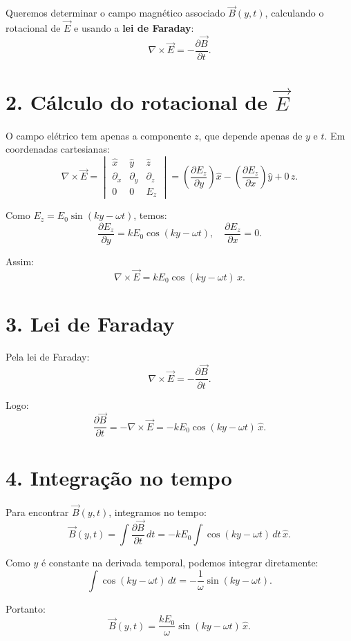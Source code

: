 \documentclass[a4paper,12pt]{article}
\begin{document}
\begin{flushleft}
Queremos determinar o campo magnético associado \(\vec{B}(y,t)\), calculando o rotacional de \(\vec{E}\) e usando a \textbf{lei de Faraday}:
\[
\nabla \times \vec{E} = -\frac{\partial \vec{B}}{\partial t}.
\]

\section*{2. Cálculo do rotacional de \(\vec{E}\)}

O campo elétrico tem apenas a componente \(z\), que depende apenas de \(y\) e \(t\).  
Em coordenadas cartesianas:
\[
\nabla \times \vec{E} =
\begin{vmatrix}
\hat{x} & \hat{y} & \hat{z} \\[4pt]
\partial_x & \partial_y & \partial_z \\[4pt]
0 & 0 & E_z
\end{vmatrix}
=
\left( \frac{\partial E_z}{\partial y} \right) \hat{x} - \left( \frac{\partial E_z}{\partial x} \right) \hat{y} + 0 \, \hat{z}.
\]

Como \(E_z = E_0 \sin(k y - \omega t)\), temos:
\[
\frac{\partial E_z}{\partial y} = k E_0 \cos(k y - \omega t),
\quad
\frac{\partial E_z}{\partial x} = 0.
\]

Assim:
\[
\nabla \times \vec{E} = k E_0 \cos(k y - \omega t) \, \hat{x}.
\]

\section*{3. Lei de Faraday}

Pela lei de Faraday:
\[
\nabla \times \vec{E} = -\frac{\partial \vec{B}}{\partial t}.
\]

Logo:
\[
\frac{\partial \vec{B}}{\partial t} = -\nabla \times \vec{E} = -k E_0 \cos(k y - \omega t) \, \hat{x}.
\]

\section*{4. Integração no tempo}

Para encontrar \(\vec{B}(y,t)\), integramos no tempo:
\[
\vec{B}(y,t) = \int \frac{\partial \vec{B}}{\partial t} \, dt = -k E_0 \int \cos(k y - \omega t) \, dt \, \hat{x}.
\]

Como \(y\) é constante na derivada temporal, podemos integrar diretamente:
\[
\int \cos(k y - \omega t) \, dt = -\frac{1}{\omega} \sin(k y - \omega t).
\]

Portanto:
\[
\vec{B}(y,t) = \frac{k E_0}{\omega} \sin(k y - \omega t) \, \hat{x}.
\]


\end{flushleft}
\end{document}
